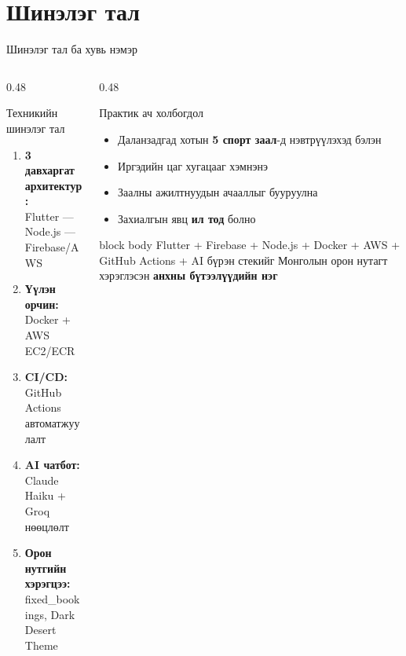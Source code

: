 \documentclass[14pt,aspectratio=169]{beamer}
\begin{document}
\section{Шинэлэг тал}
\begin{frame}{Шинэлэг тал ба хувь нэмэр}
  \begin{columns}[T]
    \begin{column}{0.48\textwidth}
      \begin{block}{Техникийн шинэлэг тал}
        \begin{enumerate}
          \item \textbf{3 давхаргат архитектур:}\\Flutter — Node.js — Firebase/AWS
          \item \textbf{Үүлэн орчин:}\\Docker + AWS EC2/ECR
          \item \textbf{CI/CD:}\\GitHub Actions автоматжуулалт
          \item \textbf{AI чатбот:}\\Claude Haiku + Groq нөөцлөлт
          \item \textbf{Орон нутгийн хэрэгцээ:}\\fixed\_bookings, Dark Desert Theme
        \end{enumerate}
      \end{block}
    \end{column}
    \begin{column}{0.48\textwidth}
      \begin{alertblock}{Практик ач холбогдол}
        \begin{itemize}
          \item Даланзадгад хотын \textbf{5 спорт заал}-д нэвтрүүлэхэд бэлэн
          \item Иргэдийн цаг хугацааг хэмнэнэ
          \item Заалны ажилтнуудын ачааллыг бууруулна
          \item Захиалгын явц \textbf{ил тод} болно
        \end{itemize}
      \end{alertblock}
      \vspace{6pt}
      \begin{beamercolorbox}[sep=4pt,rounded=true]{block body}
        \small\centering
        Flutter + Firebase + Node.js + Docker + AWS + GitHub Actions + AI
        бүрэн стекийг Монголын орон нутагт хэрэглэсэн
        \textbf{анхны бүтээлүүдийн нэг}
      \end{beamercolorbox}
    \end{column}
  \end{columns}
\end{frame}
\end{document}
